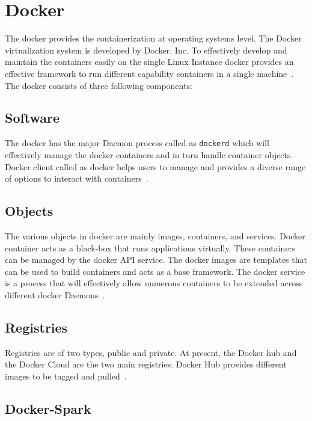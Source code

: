 \section{Docker}

The docker provides the containerization at operating systems level. The Docker 
virtualization system is developed by Docker. Inc. To effectively develop and 
maintain the containers easily on the single Linux Instance docker provides an 
effective framework to run different capability containers in a single 
machine~\cite{hid-sp18-412-docker_wikepedia}. The docker consists of three 
following components:

\subsection{Software}

The docker has the major Daemon process called as \verb|dockerd| which will 
effectively manage the docker containers and in turn handle container objects. 
Docker client called as docker helps users to manage and provides a diverse 
range of options to interact with 
containers~\cite{hid-sp18-412-docker_wikepedia}. 

\subsection{Objects}
The various objects in docker are mainly images, containers, and services. 
Docker container acts as a black-box that runs applications virtually. These 
containers can be managed by the docker API service. The docker images are 
templates that can be used to build containers and acts as a base framework. The
docker service is a process that will effectively allow numerous containers to 
be extended across different 
docker Daemons~\cite{hid-sp18-412-docker_wikepedia}.  

\subsection{Registries}

Registries are of two types, public and private. At present, the Docker hub and 
the Docker Cloud are the two main registries. Docker Hub provides different 
images to be tagged and pulled~\cite{hid-sp18-412-docker_wikepedia}.

\subsection{Docker-Spark}


